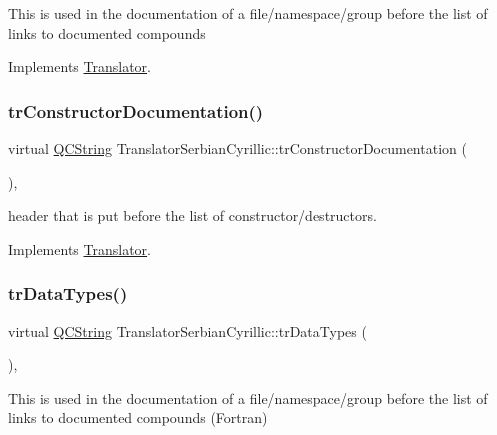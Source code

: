 This is used in the documentation of a file/namespace/group before the list of links to documented compounds 

Implements \mbox{\hyperlink{class_translator}{Translator}}.

\mbox{\label{class_translator_serbian_cyrillic_a54212d40f6ae0d1a703b8c883495fe82}} 
\subsubsection{\texorpdfstring{trConstructorDocumentation()}{trConstructorDocumentation()}}
{\footnotesize\ttfamily virtual \mbox{\hyperlink{class_q_c_string}{Q\+C\+String}} Translator\+Serbian\+Cyrillic\+::tr\+Constructor\+Documentation (\begin{DoxyParamCaption}{ }\end{DoxyParamCaption})\hspace{0.3cm}{\ttfamily [inline]}, {\ttfamily [virtual]}}

header that is put before the list of constructor/destructors. 

Implements \mbox{\hyperlink{class_translator}{Translator}}.

\mbox{\label{class_translator_serbian_cyrillic_ae57dfdf8293e9c8d8f880a4517e25066}} 
\subsubsection{\texorpdfstring{trDataTypes()}{trDataTypes()}}
{\footnotesize\ttfamily virtual \mbox{\hyperlink{class_q_c_string}{Q\+C\+String}} Translator\+Serbian\+Cyrillic\+::tr\+Data\+Types (\begin{DoxyParamCaption}{ }\end{DoxyParamCaption})\hspace{0.3cm}{\ttfamily [inline]}, {\ttfamily [virtual]}}

This is used in the documentation of a file/namespace/group before the list of links to documented compounds (Fortran) 

